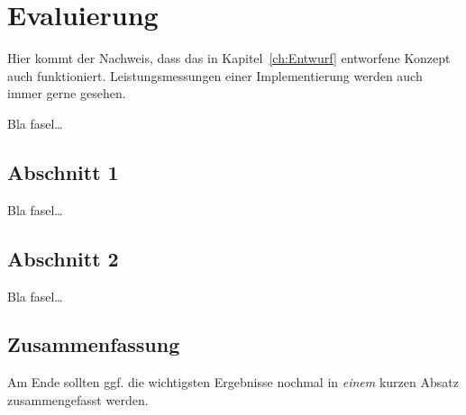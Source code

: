 
\chapter{Evaluierung}
\label{ch:Evaluierung}
Hier kommt der Nachweis, dass das in Kapitel~\ref{ch:Entwurf}
entworfene Konzept auch funktioniert. Leistungsmessungen einer
Implementierung werden auch immer gerne gesehen.

Bla fasel\ldots

\section{Abschnitt 1}
\label{ch:Evaluierung:sec:Abschnitt1}

Bla fasel\ldots

\section{Abschnitt 2}
\label{ch:Evaluierung:sec:Abschnitt2}

Bla fasel\ldots

\section{Zusammenfassung}
\label{ch:Evaluierung:sec:zusammenfassung}

Am Ende sollten ggf. die wichtigsten Ergebnisse nochmal in \emph{einem}
kurzen Absatz zusammengefasst werden.

